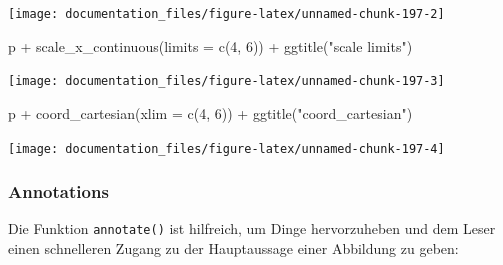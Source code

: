 \documentclass[
]{article}
\newenvironment{Shaded}{\begin{snugshade}}{\end{snugshade}}
\newcommand{\AttributeTok}[1]{\textcolor[rgb]{0.77,0.63,0.00}{#1}}
\newcommand{\DecValTok}[1]{\textcolor[rgb]{0.00,0.00,0.81}{#1}}
\newcommand{\FunctionTok}[1]{\textcolor[rgb]{0.00,0.00,0.00}{#1}}
\newcommand{\NormalTok}[1]{#1}
\newcommand{\SpecialCharTok}[1]{\textcolor[rgb]{0.00,0.00,0.00}{#1}}
\newcommand{\StringTok}[1]{\textcolor[rgb]{0.31,0.60,0.02}{#1}}
\begin{document}
\begin{center}\texttt{[image: documentation\_files/figure-latex/unnamed-chunk-197-2]} \end{center}

\begin{Shaded}
\begin{Highlighting}[]
\NormalTok{p }\SpecialCharTok{+} \FunctionTok{scale\_x\_continuous}\NormalTok{(}\AttributeTok{limits =} \FunctionTok{c}\NormalTok{(}\DecValTok{4}\NormalTok{, }\DecValTok{6}\NormalTok{)) }\SpecialCharTok{+} \FunctionTok{ggtitle}\NormalTok{(}\StringTok{"scale limits"}\NormalTok{)}
\end{Highlighting}
\end{Shaded}

\begin{center}\texttt{[image: documentation\_files/figure-latex/unnamed-chunk-197-3]} \end{center}

\begin{Shaded}
\begin{Highlighting}[]
\NormalTok{p }\SpecialCharTok{+} \FunctionTok{coord\_cartesian}\NormalTok{(}\AttributeTok{xlim =} \FunctionTok{c}\NormalTok{(}\DecValTok{4}\NormalTok{, }\DecValTok{6}\NormalTok{)) }\SpecialCharTok{+} \FunctionTok{ggtitle}\NormalTok{(}\StringTok{"coord\_cartesian"}\NormalTok{)}
\end{Highlighting}
\end{Shaded}

\begin{center}\texttt{[image: documentation\_files/figure-latex/unnamed-chunk-197-4]} \end{center}

\hypertarget{annotations}{%
\subsubsection{Annotations}\label{annotations}}

Die Funktion \texttt{annotate()} ist hilfreich, um Dinge hervorzuheben und dem Leser einen schnelleren Zugang zu der Hauptaussage einer Abbildung zu geben:
\end{document}
